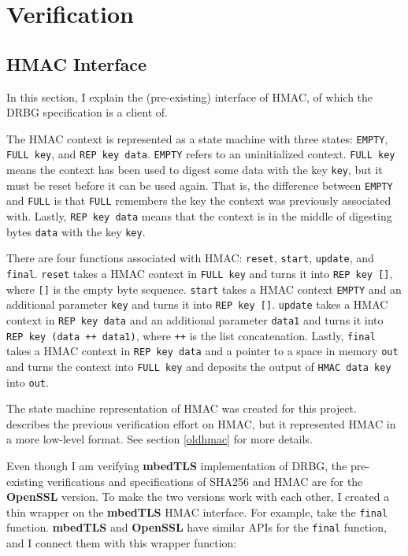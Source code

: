\documentclass[pageno]{jpaper}
\newcommand{\stdtitle}[1]{\textbf{#1}}
\begin{document}
\section{Verification}
\subsection{HMAC Interface}\label{hmac_interface}
In this section, I explain the (pre-existing) interface of HMAC, of which the DRBG specification is a client of.

The HMAC context is represented as a state machine with three states: \lstinline{EMPTY}, \lstinline{FULL key}, and \lstinline{REP key data}. \lstinline{EMPTY} refers to an uninitialized context. \lstinline{FULL key} means the context has been used to digest some data with the key \lstinline{key}, but it must be reset before it can be used again. That is, the difference between \lstinline{EMPTY} and \lstinline{FULL} is that \lstinline{FULL} remembers the key the context was previously associated with. Lastly, \lstinline{REP key data} means that the context is in the middle of digesting bytes \lstinline{data} with the key \lstinline{key}.

There are four functions associated with HMAC: \lstinline{reset}, \lstinline{start}, \lstinline{update}, and \lstinline{final}. \lstinline{reset} takes a HMAC context in \lstinline{FULL key} and turns it into \lstinline{REP key []}, where \lstinline{[]} is the empty byte sequence. \lstinline{start} takes a HMAC context \lstinline{EMPTY} and an additional parameter \lstinline{key} and turns it into \lstinline{REP key []}. \lstinline{update} takes a HMAC context in \lstinline{REP key data} and an additional parameter \lstinline{data1} and turns it into \lstinline{REP key (data ++ data1)}, where \lstinline{++} is the list concatenation. Lastly, \lstinline{final} takes a HMAC context in \lstinline{REP key data} and a pointer to a space in memory \lstinline{out} and turns the context into \lstinline{FULL key} and deposits the output of \lstinline{HMAC data key} into \lstinline{out}.

The state machine representation of HMAC was created for this project. \cite{hmac} describes the previous verification effort on HMAC, but it represented HMAC in a more low-level format. See section \ref{oldhmac} for more details.

Even though I am verifying \stdtitle{mbedTLS} implementation of DRBG, the pre-existing verifications and specifications of SHA256 and HMAC are for the \stdtitle{OpenSSL} version. To make the two versions work with each other, I created a thin wrapper on the \stdtitle{mbedTLS} HMAC interface. For example, take the \lstinline{final} function. \stdtitle{mbedTLS} and \stdtitle{OpenSSL} have similar APIs for the \lstinline{final} function, and I connect them with this wrapper function:
\end{document}
